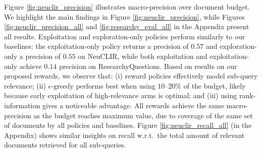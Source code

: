 Figure \ref{fig:neuclir_precision} illustrates macro-precision over document budget. We highlight the main findings in Figure \ref{fig:neuclir_precision}, while Figures \ref{fig:neuclir_precision_all} and \ref{fig:researchy_eval_all} in the Appendix present all results. Exploitation and exploration-only policies perform similarly to our baselines: the exploitation-only policy returns a precision of \(0.57\) and exploration-only a precision of \(0.55\) on NeuCLIR, while both exploitation and exploitation-only achieve \(0.14\) precision on ResearchyQuestions. Based on results on our proposed rewards, we observe that: (i) reward policies effectively model sub-query relevance; (ii) \(\epsilon\text{-greedy}\) performs best when using \(10\)--\(20\%\) of the budget, likely because early exploitation of high-relevance arms is optimal; and (iii) using rank-information gives a noticeable advantage. All rewards achieve the same macro-precision as the budget reaches maximum value, due to coverage of the same set of documents by all policies and baselines. Figure \ref{fig:neuclir_recall_all} (in the Appendix) shows similar insights on recall w.r.t.\ the total amount of relevant documents retrieved for all sub-queries.


